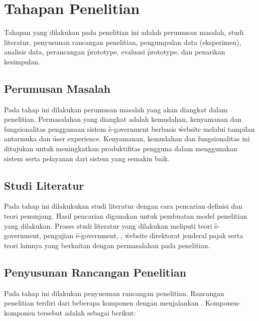\section{Tahapan Penelitian}
Tahapan yang dilakukan pada penelitian ini adalah perumusan masalah, studi literatur, penyusunan rancangan penelitian, pengumpulan data (eksperimen), analisis data, perancangan \f{prototype}, evaluasi \f{prototype}, dan penarikan kesimpulan.
\subsection{Perumusan Masalah}
Pada tahap ini dilakukan perumusan masalah yang akan diangkat dalam penelitian. Permasalahan yang diangkat adalah kemudahan, kenyamanan dan fungsionalitas penggunaan sistem \f{e-government} berbasis \f{website} melalui tampilan antarmuka dan \f{user experience}. Kenyamanan, kemudahan dan fungsionalitas ini ditujukan untuk meningkatkan produktifitas pengguna dalam menggunakan sistem serta pelayanan dari sistem yang semakin baik.
\subsection{Studi Literatur}
Pada tahap ini dilakukukan studi literatur dengan cara pencarian definisi dan teori penunjang. Hasil pencarian digunakan untuk pembuatan model penelitian yang dilakukan. Proses studi literatur yang dilakukan meliputi teori \f{e-government}, pengujian \f{e-government}, \ust, \f{website} direktorat jenderal pajak serta teori lainnya yang berkaitan dengan permasalahan pada penelitian.
\subsection{Penyusunan Rancangan Penelitian}
Pada tahap ini dilakukan penyusunan rancangan penelitian. Rancangan penelitian terdiri dari beberapa komponen dengan menjalankan \ust. Komponen-komponen tersebut adalah sebagai berikut:
